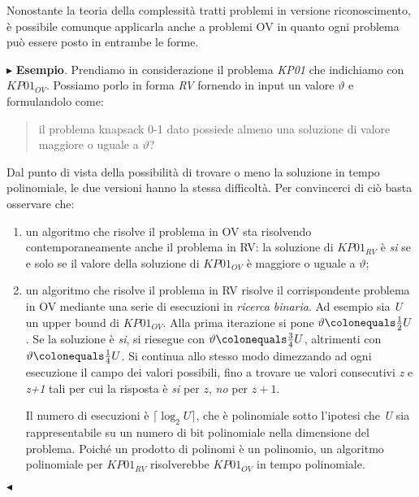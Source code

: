 \documentclass[11pt]{book}
\begin{document}
Nonostante la teoria della complessit\`a tratti problemi in versione
riconoscimento, \`e possibile comunque applicarla anche a problemi
{\textsc OV} in quanto ogni problema pu\`o essere posto in entrambe le
forme.

\vspace{11pt}
$\blacktriangleright$ {\bf Esempio}. Prendiamo in considerazione il
problema {\em KP01} che indichiamo con $KP01_{OV}$. Possiamo porlo
in forma {\em RV} fornendo in input un valore $\vartheta$ e
formulandolo come:

\begin{quote}
il problema knapsack 0-1 dato possiede almeno una soluzione di valore
maggiore o uguale a $\vartheta$?
\end{quote}

Dal punto di vista della possibilit\`a di trovare o meno la soluzione
in tempo polinomiale, le due versioni hanno la stessa
difficolt\`a. Per convincerci di ci\`o basta osservare che:

\begin{enumerate}
\item un algoritmo che risolve il problema in OV sta risolvendo
  contemporaneamente anche il problema in RV: la soluzione di
  $KP01_{RV}$ \`e {\em si} se e solo se il valore della soluzione di
  $KP01_{OV}$ \`e maggiore o uguale a $\vartheta$;

\item un algoritmo che risolve il problema in RV risolve il
  corrispondente problema in OV mediante una serie di esecuzioni in
  {\em ricerca binaria}. Ad esempio sia {\em U} un upper bound di
  $KP01_{OV}$. Alla prima iterazione si pone $\vartheta \colonequals
  \frac{1}{2}U$. Se la soluzione \`e {\em si}, si riesegue con
  $\vartheta \colonequals \frac{3}{4}U$, altrimenti con $\vartheta
  \colonequals \frac{1}{4}U$. Si continua allo stesso modo dimezzando
  ad ogni esecuzione il campo dei valori possibili, fino a trovare ue
  valori consecutivi {\em z} e {\em z+1} tali per cui la risposta \`e
  {\em si} per $z$, {\em no} per $z+1$.

  Il numero di esecuzioni \`e $\lceil \log_2 U \rceil$, che \`e
  polinomiale sotto l'ipotesi che {\em U} sia rappresentabile su un
  numero di bit polinomiale nella dimensione del problema. Poich\'e un
  prodotto di polinomi \`e un polinomio, un algoritmo polinomiale per
  $KP01_{RV}$ risolverebbe $KP01_{OV}$ in tempo polinomiale.
\end{enumerate}

$\blacktriangleleft$
\vspace{11pt}
\end{document}
